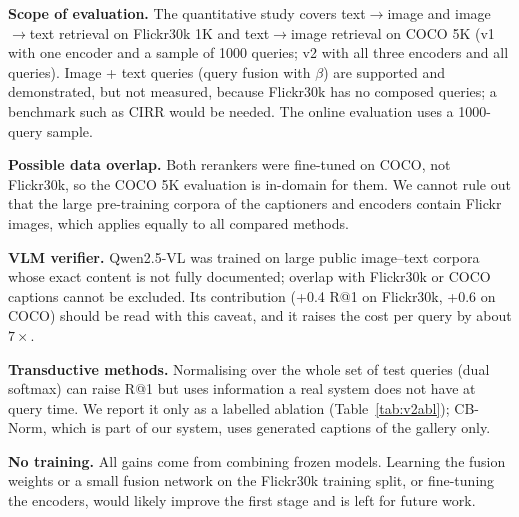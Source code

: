 \documentclass[conference]{IEEEtran}
\newcommand{\RA}{\ensuremath{\rightarrow}}
\begin{document}
\textbf{Scope of evaluation.} The quantitative study covers text\RA image and image\RA text retrieval on
Flickr30k 1K and text\RA image retrieval on COCO 5K (v1 with one encoder and a sample of 1000 queries; v2 with
all three encoders and all queries). Image + text queries (query fusion with $\beta$) are supported and demonstrated,
but not measured, because Flickr30k has no composed queries; a benchmark such as CIRR would be needed. The
online evaluation uses a 1000-query sample.

\textbf{Possible data overlap.} Both rerankers were fine-tuned on COCO, not Flickr30k, so the COCO 5K evaluation is
in-domain for them. We cannot rule out that
the large pre-training corpora of the captioners and encoders contain Flickr images, which applies equally
to all compared methods.

\textbf{VLM verifier.} Qwen2.5-VL was trained on large public image--text corpora whose exact content is not
fully documented; overlap with Flickr30k or COCO captions cannot be excluded. Its contribution (+0.4 R@1 on
Flickr30k, +0.6 on COCO) should be read with this caveat, and it raises the cost per query by about $7\times$.

\textbf{Transductive methods.} Normalising over the whole set of test queries (dual softmax) can raise R@1 but
uses information a real system does not have at query time. We report it only as a labelled ablation
(Table~\ref{tab:v2abl}); CB-Norm, which is part of our system, uses generated captions of the gallery only.

\textbf{No training.} All gains come from combining frozen models. Learning the fusion weights or a small
fusion network on the Flickr30k training split, or fine-tuning the encoders, would likely improve the first
stage and is left for future work.

\balance
\end{document}
